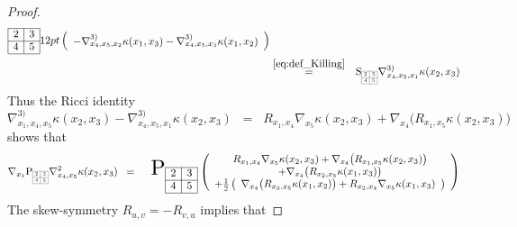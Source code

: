 \documentclass[11pt,a4paper]{article}
\theoremstyle{plain}
\theoremstyle{remark}
\newcommand{\rmP}{\mathrm{P}}
\newcommand{\rmS}{\mathrm{S}}
\begin{document}
\begin{proof}
\begin{eqnarray*}
{{\begin{array}{|c|c|}
\cline{1-2}
2 & 3 \\
\cline{1-2}
4 & 5 \\
\cline{1-2} 
\end{array}}{12pt}}\left ( \begin{array}{l}
- \nabla^{3)}_{x_4,x_5,x_2}\kappa(x_1,x_3) - \nabla^{3)}_{x_4,x_5,x_3}\kappa(x_1,x_2) \\
 \end{array}\right )\\
&\stackrel{\eqref{eq:def_Killing}}{=}& \rmS_{\scaleto{\begin{array}{|c|c|}
\cline{1-2}
2 & 3 \\
\cline{1-2}
4 & 5 \\
\cline{1-2} 
\end{array}}{12pt}} \nabla^{3)}_{x_4,x_5,x_1}\kappa(x_2,x_3)
\end{eqnarray*}
Thus the Ricci identity
\begin{equation*}
\nabla^{3)}_{x_1,x_4,x_5}\kappa(x_2,x_3)  - \nabla^{3)}_{x_4,x_5,x_1}\kappa(x_2,x_3)\;\;=\;\;R_{x_1,x_4}\nabla_{x_5}\kappa(x_2,x_3) + \nabla_{x_4} \big (R_{x_1,x_5} \kappa (x_2,x_3)\big )
\end{equation*}
shows that
\begin{eqnarray*} 
 \nabla_{x_1}\rmP_{\scaleto{\begin{array}{|c|c|}
\cline{1-2}
2 & 3 \\
\cline{1-2}
4 & 5 \\
\cline{1-2} 
\end{array}}{12pt}}\nabla^2_{x_4,x_5}\kappa(x_2,x_3) &\;\;=\;\;&\scaleto{\rmP_{\scaleto{\begin{array}{|c|c|}
\cline{1-2}
2 & 3 \\
\cline{1-2}
4 & 5 \\
\cline{1-2} 
\end{array}}{12pt}}}{32pt}\left (
\begin{array}{c}
 R_{x_1,x_4}\nabla_{x_5}\kappa(x_2,x_3)
+ \nabla_{x_4} \big ( R_{x_1,x_5} \kappa(x_2,x_3)\big )\\
 + \nabla_{x_4}\big (R_{x_2,x_5} \kappa(x_1,x_3) \big)\\ 
+ \frac{1}{2}\left ( \begin{array}{c}\nabla_{x_4}\big (R_{x_3,x_5} \kappa(x_1,x_2)\big )
+ R_{x_2,x_4} \nabla_{x_5}\kappa(x_1,x_3)\end{array} \right )
\end{array}\right )
\end{eqnarray*}
The skew-symmetry $R_{u,v} = - R_{v,u}$ implies that

\end{proof}
\end{document}

